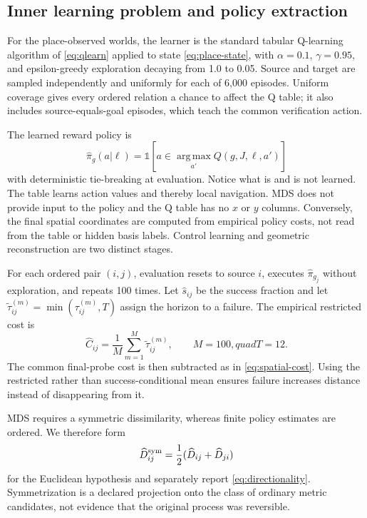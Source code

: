 \documentclass[11pt]{article}
\newcommand{\argmax}{\operatorname*{arg\,max}}
\begin{document}
\subsection{Inner learning problem and policy extraction}

For the place-observed worlds, the learner is the standard tabular Q-learning
algorithm of \cref{eq:qlearn} applied to state \cref{eq:place-state}, with
$\alpha=0.1$, $\gamma=0.95$, and epsilon-greedy exploration decaying from 1.0
to 0.05. Source and target are sampled independently and uniformly for each of
6,000 episodes. Uniform coverage gives every ordered relation a chance to
affect the Q table; it also includes source-equals-goal episodes, which teach
the common verification action.

The learned reward policy is
\begin{equation}
 \widehat\pi_g(a|\ell)=
 \mathbb 1\!\left[a\in\argmax_{a'}Q(g,J,\ell,a')\right]
 \label{eq:spatial-greedy-policy}
\end{equation}
with deterministic tie-breaking at evaluation. Notice what is and is not
learned. The table learns action values and thereby local navigation. MDS does
not provide input to the policy and the Q table has no $x$ or $y$ columns.
Conversely, the final spatial coordinates are computed from empirical policy
costs, not read from the table or hidden basis labels. Control learning and
geometric reconstruction are two distinct stages.

For each ordered pair $(i,j)$, evaluation resets to source $i$, executes
$\widehat\pi_{g_j}$ without exploration, and repeats 100 times. Let
$\widehat s_{ij}$ be the success fraction and let
$\widetilde\tau_{ij}^{(m)}=\min(\tau_{ij}^{(m)},T)$ assign the horizon to a
failure. The empirical restricted cost is
\begin{equation}
 \widehat C_{ij}=\frac1M\sum_{m=1}^M\widetilde\tau_{ij}^{(m)},
 \qquad M=100,quad T=12.
 \label{eq:empirical-spatial-cost}
\end{equation}
The common final-probe cost is then subtracted as in
\cref{eq:spatial-cost}. Using the restricted rather than success-conditional
mean ensures failure increases distance instead of disappearing from it.

MDS requires a symmetric dissimilarity, whereas finite policy estimates are
ordered. We therefore form
\begin{equation}
 \widehat D^{\rm sym}_{ij}
 =\frac12(\widehat D_{ij}+\widehat D_{ji})
 \label{eq:symmetrization}
\end{equation}
for the Euclidean hypothesis and separately report
\cref{eq:directionality}. Symmetrization is a declared projection onto the
class of ordinary metric candidates, not evidence that the original process
was reversible.
\end{document}
